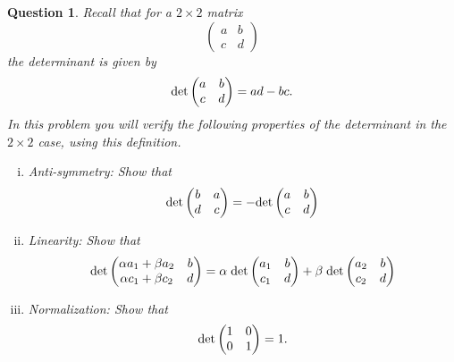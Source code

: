 \documentclass[12pt]{article}
\newtheorem{question}[thm]{Question}
\begin{document}
\begin{question}	\normalfont
	Recall that for a $2\times 2$ matrix 
	\[
	\begin{pmatrix}
			a & b \\
			c & d
		\end{pmatrix}
\]
the determinant is given by
\[
\textup{det} \begin{pmatrix}
			a & b \\
			c & d
		\end{pmatrix} = ad - bc. 
\]
In this problem you will verify the following properties of the determinant in the $2\times 2$ case, using this definition. 

\begin{enumerate}[(i)]

\item \emph{Anti-symmetry}: Show that 
\[
\textup{det}\begin{pmatrix}
			b & a \\
			d & c
		\end{pmatrix} = - \textup{det}\begin{pmatrix}
			a & b \\
			c & d
		\end{pmatrix} 
\]
\item \emph{Linearity}: Show that 
\[
\textup{det}\begin{pmatrix}
			\alpha a_1 + \beta a_2 & b \\
			\alpha c_1 + \beta c_2 & d
		\end{pmatrix} = \alpha \hspace{.1cm} \textup{det}\begin{pmatrix}
			a_1 & b \\
			c_1 & d
		\end{pmatrix} + \beta  \hspace{.1cm}  \textup{det}\begin{pmatrix}
			a_2 & b \\
			c_2 & d
		\end{pmatrix}  
\]

\item \emph{Normalization}: Show that 
\[
\textup{det}\begin{pmatrix}
			1 & 0 \\
			0 & 1
		\end{pmatrix} = 1.
\]

\end{enumerate}

\end{question}
	
\end{document}
